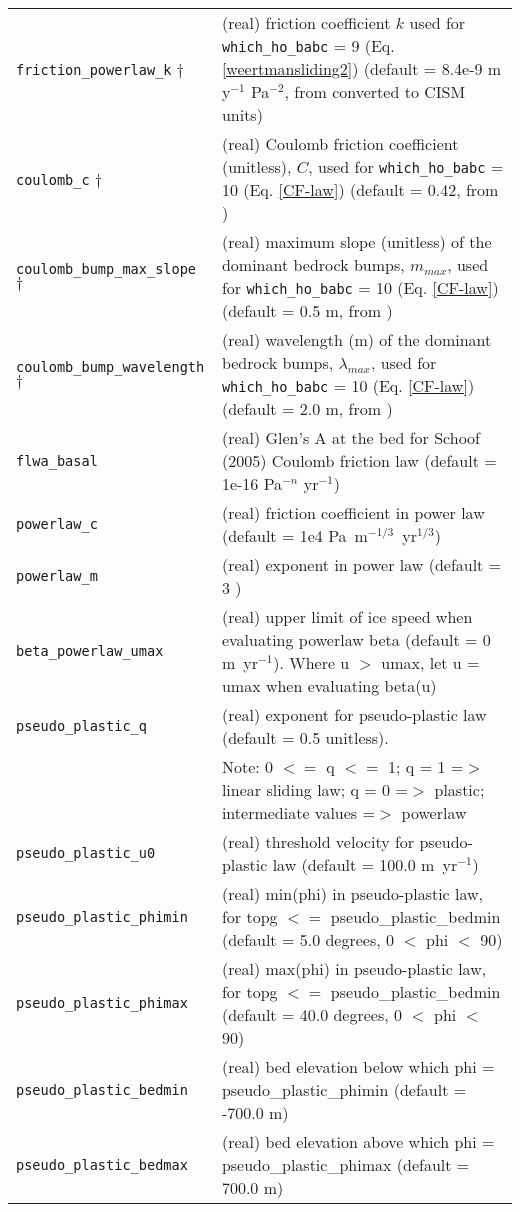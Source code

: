 \begin{center}
\begin{supertabular*}{\linewidth}{@{\extracolsep{\fill}}|l|p{9cm}|}
    \texttt{friction\_powerlaw\_k} $\dagger$ & (real) friction coefficient $k$ used for \texttt{which\_ho\_babc} = 9 (Eq. \ref{weertmansliding2}) (default = 8.4e-9 m y$^{-1}$ Pa$^{-2}$, from \citet{Bindschadler1983} converted to CISM units) \\
    \texttt{coulomb\_c} $\dagger$ & (real) Coulomb friction coefficient (unitless), $C$,
used for \texttt{which\_ho\_babc} = 10 (Eq. \ref{CF-law}) (default = 0.42, from \citet{Pimentel2010a}) \\
    \texttt{coulomb\_bump\_max\_slope} $\dagger$ & (real) maximum slope (unitless) of the dominant bedrock bumps, $m_{max}$,
used for \texttt{which\_ho\_babc} = 10 (Eq. \ref{CF-law}) (default = 0.5 m, from \citet{Pimentel2010a}) \\
    \texttt{coulomb\_bump\_wavelength} $\dagger$ & (real) wavelength (m) of the dominant bedrock bumps, $\lambda_{max}$,
used for \texttt{which\_ho\_babc} = 10 (Eq. \ref{CF-law}) (default = 2.0 m, from \citet{Pimentel2010a}) \\
    \texttt{flwa\_basal} & (real) Glen's A at the bed for Schoof (2005) Coulomb friction law (default = 1e-16 Pa$^{-n}$ yr$^{-1}$) \\ 
    \texttt{powerlaw\_c} & (real) friction coefficient in power law (default = 1e4 Pa~m$^{-1/3}$~yr$^{1/3}$)\\
    \texttt{powerlaw\_m} & (real) exponent in power law (default = 3 )\\
    \texttt{beta\_powerlaw\_umax} & (real) upper limit of ice speed when evaluating powerlaw beta (default = 0 m~yr$^{-1}$). Where u $>$ umax, let u = umax when evaluating beta(u)\\
    
    \texttt{pseudo\_plastic\_q} & (real) exponent for pseudo-plastic law (default = 0.5 unitless). \\ & Note:
    0 $<=$ q $<=$ 1; q = 1 =$>$ linear sliding law; q = 0 =$>$ plastic; intermediate values =$>$ powerlaw\\
    \texttt{pseudo\_plastic\_u0} & (real) threshold velocity for pseudo-plastic law (default = 100.0 m~yr$^{-1}$)\\ 
    \texttt{pseudo\_plastic\_phimin} & (real) min(phi) in pseudo-plastic law, for topg $<=$ pseudo\_plastic\_bedmin (default = 5.0 degrees, 0 $<$ phi $<$ 90) \\ 
    \texttt{pseudo\_plastic\_phimax} & (real) max(phi) in pseudo-plastic law, for topg $<=$ pseudo\_plastic\_bedmin (default = 40.0 degrees, 0 $<$ phi $<$ 90) \\ 
    \texttt{pseudo\_plastic\_bedmin} & (real) bed elevation below which phi = pseudo\_plastic\_phimin (default = -700.0 m) \\ 
    \texttt{pseudo\_plastic\_bedmax} & (real) bed elevation above which phi = pseudo\_plastic\_phimax (default = 700.0 m) \\ 


\end{supertabular*}
\end{center}
